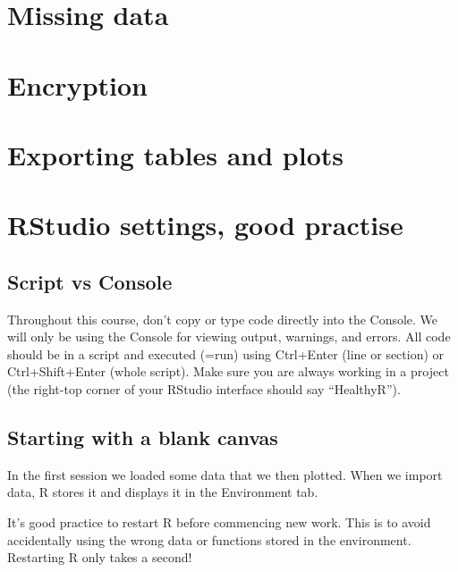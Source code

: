 \documentclass[12pt,]{krantz}
\theoremstyle{definition}
\theoremstyle{definition}
\theoremstyle{definition}
\theoremstyle{remark}
\begin{document}
\hypertarget{missing-data}{%
\chapter{Missing data}\label{missing-data}}

\hypertarget{encryption}{%
\chapter{Encryption}\label{encryption}}

\hypertarget{exporting-tables-and-plots}{%
\chapter{Exporting tables and plots}\label{exporting-tables-and-plots}}

\hypertarget{rstudio-settings-good-practise}{%
\chapter{RStudio settings, good
practise}\label{rstudio-settings-good-practise}}

\hypertarget{script-vs-console}{%
\section{Script vs Console}\label{script-vs-console}}

Throughout this course, don't copy or type code directly into the
Console. We will only be using the Console for viewing output, warnings,
and errors. All code should be in a script and executed (=run) using
Ctrl+Enter (line or section) or Ctrl+Shift+Enter (whole script). Make
sure you are always working in a project (the right-top corner of your
RStudio interface should say ``HealthyR'').

\hypertarget{starting-with-a-blank-canvas}{%
\section{Starting with a blank
canvas}\label{starting-with-a-blank-canvas}}

In the first session we loaded some data that we then plotted. When we
import data, R stores it and displays it in the Environment tab.

It's good practice to restart R before commencing new work. This is to
avoid accidentally using the wrong data or functions stored in the
environment.\\
Restarting R only takes a second!
\end{document}
